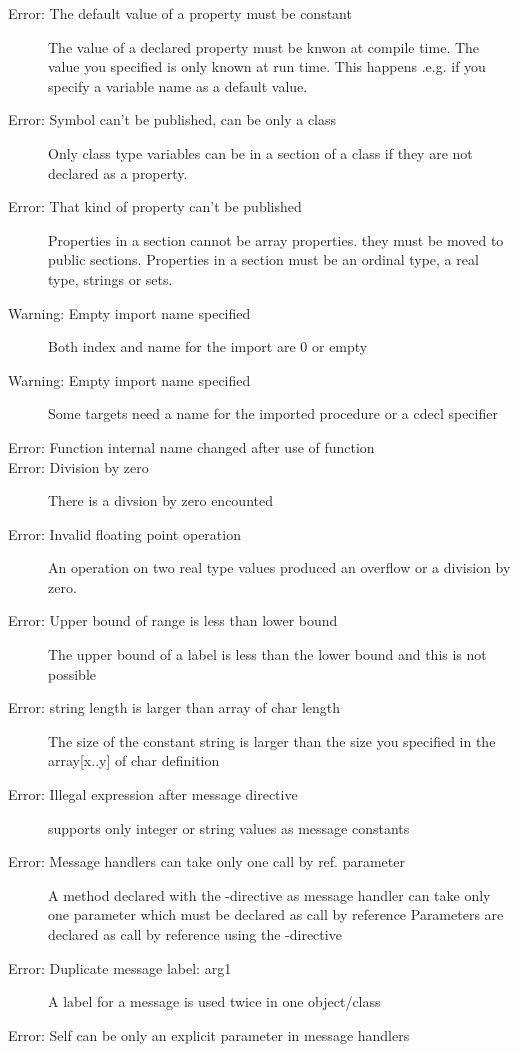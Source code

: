 \begin{description}
\item [Error: The default value of a property must be constant]
 The value of a  declared property must be knwon at compile
 time. The value you specified is only known at run time. This happens
 .e.g. if you specify a variable name as a default value.
\item [Error: Symbol can't be published, can be only a class]
 Only class type variables can be in a  section of a class
 if they are not declared as a property.
\item [Error: That kind of property can't be published]
 Properties in a  section cannot be array properties.
 they must be moved to public sections. Properties in a 
 section must be an ordinal type, a real type, strings or sets.
\item [Warning: Empty import name specified]
 Both index and name for the import are 0 or empty
\item [Warning: Empty import name specified]
 Some targets need a name for the imported procedure or a cdecl specifier
\item [Error: Function internal name changed after use of function]
\item [Error: Division by zero]
 There is a divsion by zero encounted
\item [Error: Invalid floating point operation]
 An operation on two real type values produced an overflow or a division
 by zero.
\item [Error: Upper bound of range is less than lower bound]
 The upper bound of a  label is less than the lower bound and this
 is not possible
\item [Error: string length is larger than array of char length]
 The size of the constant string is larger than the size you specified in
 the array[x..y] of char definition
\item [Error: Illegal expression after message directive]
 \fpc supports only integer or string values as message constants
\item [Error: Message handlers can take only one call by ref. parameter]
 A method declared with the -directive as message handler
 can take only one parameter which must be declared as call by reference
 Parameters are declared as call by reference using the -directive
\item [Error: Duplicate message label: arg1]
 A label for a message is used twice in one object/class
\item [Error: Self can be only an explicit parameter in message handlers]

\end{description}
